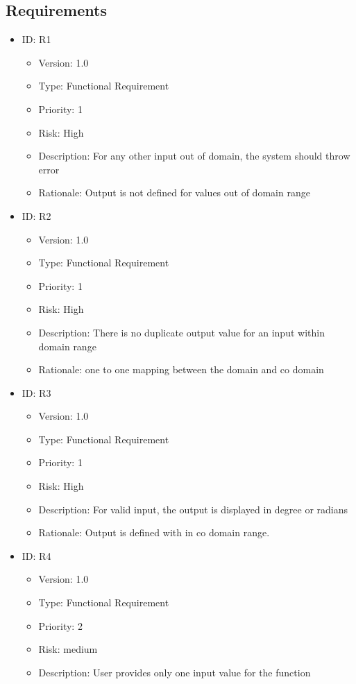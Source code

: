 \documentclass[12pt]{report}
\begin{document}
\subsection{Requirements}
\begin{itemize}
\item ID: R1
\begin{itemize}
\item Version:  1.0
\item Type: Functional Requirement
\item Priority: 1
\item Risk: High
\item Description: For any other input out of domain, the system should throw error
\item Rationale: Output is not defined for values out of domain range
\end{itemize}
\item ID: R2
\begin{itemize}
\item Version:  1.0
\item Type: Functional Requirement
\item Priority: 1
\item Risk: High
\item Description: There is no duplicate output value for an input within domain range
\item Rationale: one to one mapping between the domain and co domain
\end{itemize}
\item ID: R3
\begin{itemize}
\item Version:  1.0
\item Type: Functional Requirement
\item Priority: 1
\item Risk: High
\item Description: For valid input, the output is displayed in degree or radians
\item Rationale: Output is defined with in co domain range.
\end{itemize}
\item ID: R4
\begin{itemize}
\item Version:  1.0
\item Type: Functional Requirement
\item Priority: 2
\item Risk: medium
\item Description: User provides only one input value for the function

\end{itemize}
\end{itemize}
\end{document}
